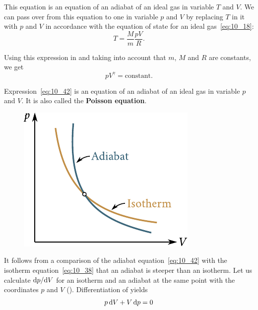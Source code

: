 This equation is an equation of an adiabat of an ideal gas in variable $T$ and $V$. We can pass over from this equation to one in variable $p$ and $V$ by replacing $T$ in it with $p$ and $V$ in accordance with the equation of state for an ideal gas~\eqref{eq:10_18}:
\begin{equation*}
	T = \frac{M}{m}\frac{pV}{R}.
\end{equation*}

\noindent
Using this expression in  and taking into account that $m$, $M$ and $R$ are constants, we get
\begin{equation}\label{eq:10_42}
	p V^{\gamma} = \text{constant}.
\end{equation}


Expression~\eqref{eq:10_42} is an equation of an adiabat of an ideal gas in variable $p$ and $V$. It is also called the \textbf{Poisson equation}.

\begin{figure}[t]
	\begin{center}
		\includegraphics[scale=1.0]{figures/ch_10/fig_10_6.pdf}
		\caption[]{}
		\label{fig:10_6}
	\end{center}
	\vspace{-0.8cm}
\end{figure}

It follows from a comparison of the adiabat equation~\eqref{eq:10_42} with the isotherm equation~\eqref{eq:10_38} that an adiabat is steeper than an isotherm. Let us calculate $\mathrm{d} p/\mathrm{d} V$ for an isotherm and an adiabat at the same point with the coordinates $p$ and $V$ (). Differentiation of  yields
\begin{equation*}
	p\,\mathrm{d} V + V\,\mathrm{d} p = 0
\end{equation*}

